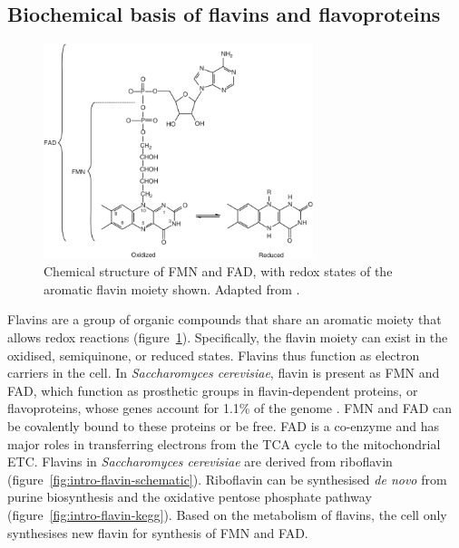 \subsection{Biochemical basis of flavins and flavoproteins}
\label{subsec:intro-flavin-biochem}

\begin{figure}
  \centering
  \includegraphics[width=0.7\textwidth]{patelFlavinContainingOxidativeBiocatalysts2006_1}
  \caption{
    Chemical structure of FMN and FAD, with redox states of the aromatic flavin moiety shown.
    Adapted from \citet{patelFlavinContainingOxidativeBiocatalysts2006}.}
  \label{fig:intro-flavin-structure}
\end{figure}

Flavins are a group of organic compounds that share an aromatic moiety that allows redox reactions (figure~\ref{fig:intro-flavin-structure}).
Specifically, the flavin moiety can exist in the oxidised, semiquinone, or reduced states.
Flavins thus function as electron carriers in the cell.
In \emph{Saccharomyces cerevisiae}, flavin is present as FMN and FAD, which function as prosthetic groups in flavin-dependent proteins, or flavoproteins, whose genes account for 1.1\% of the genome \citep{gudipatiFlavoproteomeYeastSaccharomyces2014}.
FMN and FAD can be covalently bound to these proteins or be free.
FAD is a co-enzyme and has major roles in transferring electrons from the TCA cycle to the mitochondrial ETC.
Flavins in \emph{Saccharomyces cerevisiae} are derived from riboflavin (figure~\ref{fig:intro-flavin-schematic}).
Riboflavin can be synthesised \emph{de novo} from purine biosynthesis and the oxidative pentose phosphate pathway (figure~\ref{fig:intro-flavin-kegg}).
Based on the metabolism of flavins, the cell only synthesises new flavin for synthesis of FMN and FAD.

